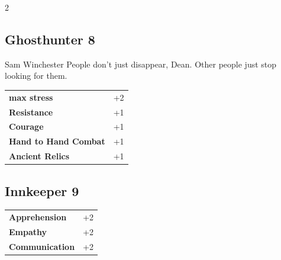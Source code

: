 \begin{multicols}{2}
\begin{tcolorbox}

\end{tcolorbox}

\begin{tcolorbox}
    \subsection*{Ghosthunter \hfill \small{8 }}
    \tcblower


\begin{pquote}{Sam Winchester}
People don’t just disappear, Dean. Other people just stop looking for them.
\end{pquote}

\vspace{3mm}

\begin{tabular}{@{}ll@{}}
    \textbf{max stress} & +2\\
    \textbf{Resistance} & +1\\
    \textbf{Courage} & +1\\
    \textbf{Hand to Hand Combat} & +1\\
    \textbf{Ancient Relics} & +1\\
\end{tabular}


\end{tcolorbox}

\begin{tcolorbox}
    \subsection*{Innkeeper \hfill \small{9 }}
    \tcblower




\begin{tabular}{@{}ll@{}}
    \textbf{Apprehension} & +2\\
    \textbf{Empathy} & +2\\
    \textbf{Communication} & +2\\
\end{tabular}


\end{tcolorbox}
\end{multicols}
